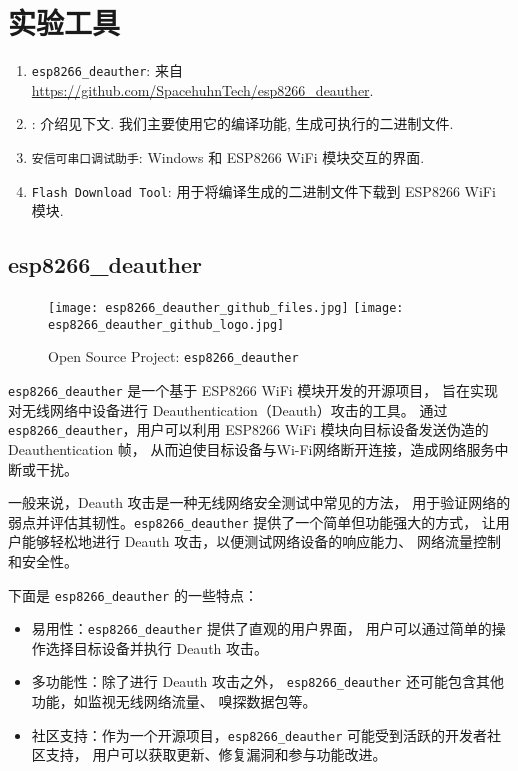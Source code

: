 \documentclass[../main.tex]{subfiles}
\begin{document}
\section{实验工具}
\begin{enumerate}
  \item \texttt{esp8266\_deauther}: 来自
    \url{https://github.com/SpacehuhnTech/esp8266_deauther}.
  \item {}: 介绍见下文. 我们主要使用它的编译功能,
    生成可执行的二进制文件.
  \item \texttt{安信可串口调试助手}: Windows 和 ESP8266 WiFi 模块交互的界面.
  \item \texttt{Flash Download Tool}: 用于将编译生成的二进制文件下载到 ESP8266
    WiFi 模块.
\end{enumerate}
%
\subsection*{esp8266\_deauther}
\begin{figure}[H]
  \begin{center}
    \texttt{[image: esp8266\_deauther\_github\_files.jpg]}
    \texttt{[image: esp8266\_deauther\_github\_logo.jpg]}
  \end{center}
  \caption{Open Source Project: \texttt{esp8266\_deauther}}
\end{figure}
%
\texttt{esp8266\_deauther} 是一个基于 ESP8266 WiFi 模块开发的开源项目，
旨在实现对无线网络中设备进行 Deauthentication（Deauth）攻击的工具。
通过 \texttt{esp8266\_deauther}，用户可以利用 ESP8266 WiFi 模块向目标设备发送伪造的 Deauthentication 帧，
从而迫使目标设备与Wi-Fi网络断开连接，造成网络服务中断或干扰。

一般来说，Deauth 攻击是一种无线网络安全测试中常见的方法，
用于验证网络的弱点并评估其韧性。\texttt{esp8266\_deauther} 提供了一个简单但功能强大的方式，
让用户能够轻松地进行 Deauth 攻击，以便测试网络设备的响应能力、
网络流量控制和安全性。

下面是 \texttt{esp8266\_deauther} 的一些特点：
\begin{itemize}
  \item 易用性：\texttt{esp8266\_deauther} 提供了直观的用户界面，
    用户可以通过简单的操作选择目标设备并执行 Deauth 攻击。
  \item 多功能性：除了进行 Deauth 攻击之外，
    \texttt{esp8266\_deauther} 还可能包含其他功能，如监视无线网络流量、
    嗅探数据包等。
  \item 社区支持：作为一个开源项目，\texttt{esp8266\_deauther} 可能受到活跃的开发者社区支持，
    用户可以获取更新、修复漏洞和参与功能改进。
\end{itemize}
%
\end{document}
